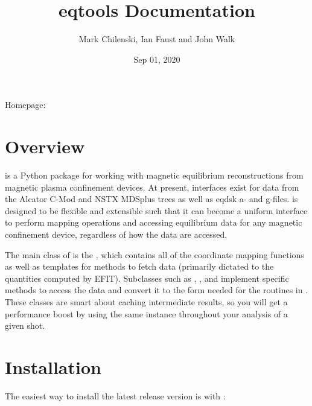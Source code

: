 \documentclass[letterpaper,10pt,english]{sphinxmanual}
\title{eqtools Documentation}
\date{Sep 01, 2020}
\author{Mark Chilenski, Ian Faust and John Walk}
\begin{document}
\pagestyle{empty}
\sphinxmaketitle
\pagestyle{plain}
\sphinxtableofcontents
\pagestyle{normal}
\label{\detokenize{index::doc}}


Homepage: 


\chapter{Overview}
\label{\detokenize{index:overview}}
{\hyperref[\detokenize{eqtools:module-eqtools}]{}} is a Python package for working with magnetic equilibrium reconstructions from magnetic plasma confinement devices. At present, interfaces exist for data from the Alcator C-Mod and NSTX MDSplus trees as well as eqdsk a- and g-files. {\hyperref[\detokenize{eqtools:module-eqtools}]{}} is designed to be flexible and extensible such that it can become a uniform interface to perform mapping operations and accessing equilibrium data for any magnetic confinement device, regardless of how the data are accessed.

The main class of {\hyperref[\detokenize{eqtools:module-eqtools}]{}} is the {\hyperref[\detokenize{eqtools:eqtools.core.Equilibrium}]{}}, which contains all of the coordinate mapping functions as well as templates for methods to fetch data (primarily dictated to the quantities computed by EFIT). Subclasses such as {\hyperref[\detokenize{eqtools:eqtools.EFIT.EFITTree}]{}}, {\hyperref[\detokenize{eqtools:eqtools.CModEFIT.CModEFITTree}]{}}, {\hyperref[\detokenize{eqtools:eqtools.NSTXEFIT.NSTXEFITTree}]{}} and {\hyperref[\detokenize{eqtools:eqtools.eqdskreader.EqdskReader}]{}} implement specific methods to access the data and convert it to the form needed for the routines in {\hyperref[\detokenize{eqtools:eqtools.core.Equilibrium}]{}}. These classes are smart about caching intermediate results, so you will get a performance boost by using the same instance throughout your analysis of a given shot.


\chapter{Installation}
\label{\detokenize{index:installation}}
The easiest way to install the latest release version is with :
\end{document}
